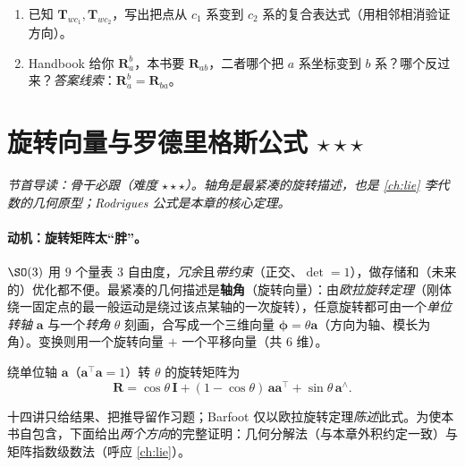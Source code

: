\begin{practice}
\begin{enumerate}
  \item 已知 $\mathbf{T}_{wc_1},\mathbf{T}_{wc_2}$，写出把点从 $c_1$ 系变到 $c_2$ 系的复合表达式（用相邻相消验证方向）。
  \item Handbook 给你 $\mathbf{R}_a^b$，本书要 $\mathbf{R}_{ab}$，二者哪个把 $a$ 系坐标变到 $b$ 系？哪个反过来？\emph{答案线索}：$\mathbf{R}_a^b=\mathbf{R}_{ba}$。
\end{enumerate}
\end{practice}

\section{旋转向量与罗德里格斯公式 \texorpdfstring{$\star\star\star$}{***}}
\label{sec:rb-axisangle}
\noindent\emph{节首导读：骨干必跟（难度 $\star\star\star$）。轴角是最紧凑的旋转描述，也是 \cref{ch:lie} 李代数的几何原型；Rodrigues 公式是本章的核心定理。}

\paragraph{动机：旋转矩阵太“胖”。}$\SO(3)$ 用 $9$ 个量表 $3$ 自由度，\emph{冗余}且\emph{带约束}（正交、$\det=1$），做存储和（未来的）优化都不便\cite{gaoxiang2019slam14}。最紧凑的几何描述是\textbf{轴角}（旋转向量）：由\emph{欧拉旋转定理}（刚体绕一固定点的最一般运动是绕过该点某轴的一次旋转\cite{barfoot2024state}），任意旋转都可由一个\emph{单位转轴} $\mathbf{a}$ 与一个\emph{转角} $\theta$ 刻画，合写成一个三维向量 $\boldsymbol{\phi}=\theta\mathbf{a}$（方向为轴、模长为角）。变换则用一个旋转向量 $+$ 一个平移向量（共 $6$ 维）。

\begin{theorem}\label{thm:rodrigues-rb}
绕单位轴 $\mathbf{a}$（$\mathbf{a}^\top\mathbf{a}=1$）转 $\theta$ 的旋转矩阵为
\begin{equation}
  \mathbf{R}=\cos\theta\,\mathbf{I}+(1-\cos\theta)\,\mathbf{a}\mathbf{a}^\top+\sin\theta\,\mathbf{a}^\wedge.
  \label{eq:rodrigues-rb}
\end{equation}
\end{theorem}
\noindent 十四讲只给结果、把推导留作习题；Barfoot 仅以欧拉旋转定理\emph{陈述}此式。为使本书自包含，下面给出\emph{两个方向}的完整证明：几何分解法（与本章外积约定一致）与矩阵指数级数法（呼应 \cref{ch:lie}）。

